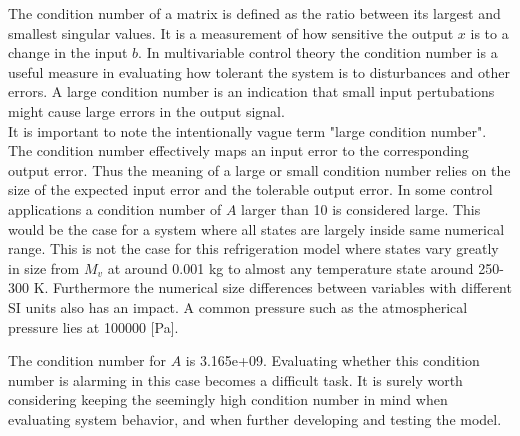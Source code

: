 The condition number of a matrix is defined as the ratio between its largest and smallest singular values. It is a measurement of how sensitive the output $x$ is to a change in the input $b$. In multivariable control theory the condition number is a useful measure in evaluating how tolerant the system is to disturbances and other errors. A large condition number is an indication that small input pertubations might cause large errors in the output signal.\\

It is important to note the intentionally vague term "large condition number". The condition number effectively maps an input error to the corresponding output error. Thus the meaning of a large or small condition number relies on the size of the expected input error and the tolerable output error. In some control applications a condition number of $A$ larger than 10 is considered large. This would be the case for a system where all states are largely inside same numerical range. This is not the case for this refrigeration model where states vary greatly in size from $M_v$ at around 0.001 \si{kg} to almost any temperature state around 250-300 \si{K}. Furthermore the numerical size differences between variables with different SI units also has an impact. A common pressure such as the atmospherical pressure lies at 100000 [Pa].

The condition number for $A$ is 3.165e+09. Evaluating whether this condition number is alarming in this case becomes a difficult task. It is surely worth considering keeping the seemingly high condition number in mind when evaluating system behavior, and when further developing and testing the model.


